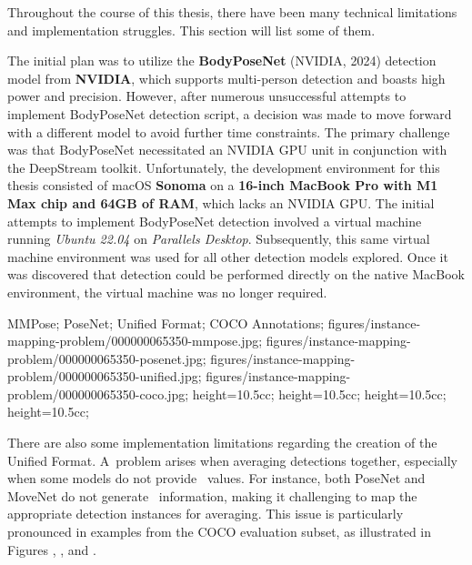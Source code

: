 Throughout the course of this thesis, there have been many technical limitations and implementation struggles. This section will list some of them.

The initial plan was to utilize the {\bf BodyPoseNet} (NVIDIA, 2024) detection model from {\bf NVIDIA}, which supports multi-person detection and boasts high power and precision. However, after numerous unsuccessful attempts to implement BodyPoseNet detection script, a decision was made to move forward with a different model to avoid further time constraints. The primary challenge was that BodyPoseNet necessitated an NVIDIA GPU unit in conjunction with the DeepStream toolkit. Unfortunately, the development environment for this thesis consisted of macOS {\bf Sonoma} on a {\bf 16-inch MacBook Pro with M1 Max chip and 64GB of RAM}, which lacks an NVIDIA GPU. The initial attempts to implement BodyPoseNet detection involved a virtual machine running {\em Ubuntu 22.04} on {\em Parallels Desktop}. Subsequently, this same virtual machine environment was used for all other detection models explored. Once it was discovered that detection could be performed directly on the native MacBook environment, the virtual machine was no longer required.

    {
        MMPose;
        PoseNet;
        Unified Format;
        COCO Annotations;
    }
    {
        figures/instance-mapping-problem/000000065350-mmpose.jpg;
        figures/instance-mapping-problem/000000065350-posenet.jpg;
        figures/instance-mapping-problem/000000065350-unified.jpg;
        figures/instance-mapping-problem/000000065350-coco.jpg;
    }
    {
        height=10.5cc;
        height=10.5cc;
        height=10.5cc;
        height=10.5cc;
    }

There are also some implementation limitations regarding the creation of the Unified Format. A~problem arises when averaging detections together, especially when some models do not provide \BBOX\ values. For instance, both PoseNet and MoveNet do not generate \BBOX\ information, making it challenging to map the appropriate detection instances for averaging. This issue is particularly pronounced in examples from the COCO evaluation subset, as illustrated in Figures , , and .

